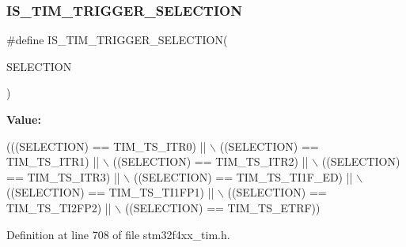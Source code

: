 \mbox{\label{group___t_i_m___internal___trigger___selection_ga36e47cf625c695a368a68280e950dfbc}} 
\subsubsection{\texorpdfstring{I\+S\+\_\+\+T\+I\+M\+\_\+\+T\+R\+I\+G\+G\+E\+R\+\_\+\+S\+E\+L\+E\+C\+T\+I\+ON}{IS\_TIM\_TRIGGER\_SELECTION}}
{\footnotesize\ttfamily \#define I\+S\+\_\+\+T\+I\+M\+\_\+\+T\+R\+I\+G\+G\+E\+R\+\_\+\+S\+E\+L\+E\+C\+T\+I\+ON(\begin{DoxyParamCaption}\item[{}]{S\+E\+L\+E\+C\+T\+I\+ON }\end{DoxyParamCaption})}

{\bfseries Value\+:}
\begin{DoxyCode}
(((SELECTION) == TIM\_TS\_ITR0) || \(\backslash\)
                                             ((SELECTION) == TIM\_TS\_ITR1) || \(\backslash\)
                                             ((SELECTION) == TIM\_TS\_ITR2) || \(\backslash\)
                                             ((SELECTION) == TIM\_TS\_ITR3) || \(\backslash\)
                                             ((SELECTION) == TIM\_TS\_TI1F\_ED) || \(\backslash\)
                                             ((SELECTION) == TIM\_TS\_TI1FP1) || \(\backslash\)
                                             ((SELECTION) == TIM\_TS\_TI2FP2) || \(\backslash\)
                                             ((SELECTION) == TIM\_TS\_ETRF))
\end{DoxyCode}


Definition at line 708 of file stm32f4xx\+\_\+tim.\+h.

